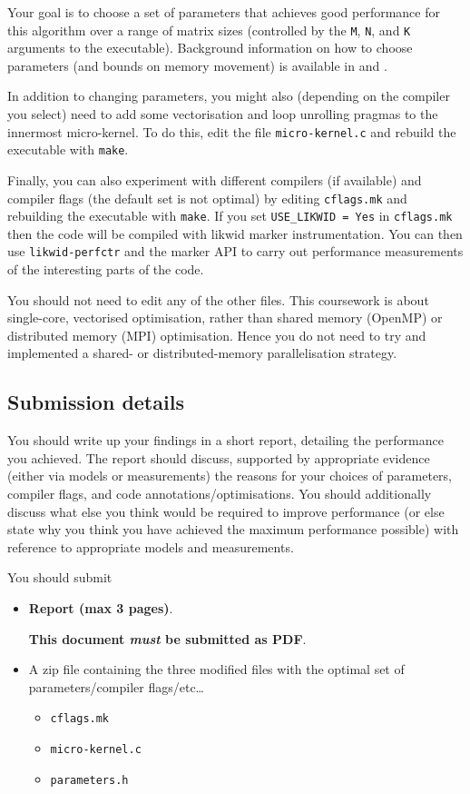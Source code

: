 \documentclass[a4paper]{article}
\begin{document}
Your goal is to choose a set of parameters that achieves good
performance for this algorithm over a range of matrix sizes
(controlled by the \texttt{M}, \texttt{N}, and \texttt{K} arguments to
the executable). Background information on how to choose
parameters (and bounds on memory movement) is available in
\textcite{Low:2016} and \textcite{Smith:2017}.

In addition to changing parameters, you might also (depending on the
compiler you select) need to add some vectorisation and loop unrolling
pragmas to the innermost micro-kernel. To do this, edit the file
\texttt{micro-kernel.c} and rebuild the executable with \texttt{make}.

Finally, you can also experiment with different compilers (if
available) and compiler flags (the default set is not optimal) by
editing \texttt{cflags.mk} and rebuilding the executable with
\texttt{make}. If you set \texttt{USE\_LIKWID = Yes} in
\texttt{cflags.mk} then the code will be compiled with likwid marker
instrumentation. You can then use \texttt{likwid-perfctr} and the
marker API to carry out performance measurements of the interesting
parts of the code.

You should not need to edit any of the other files. This coursework is
about single-core, vectorised optimisation, rather than shared memory
(OpenMP) or distributed memory (MPI) optimisation. Hence you do not
need to try and implemented a shared- or distributed-memory
parallelisation strategy.

\pagebreak
\subsection{Submission details}
\label{sec:submission}

You should write up your findings in a short report, detailing the
performance you achieved. The report should discuss, supported by
appropriate evidence (either via models or measurements) the reasons
for your choices of parameters, compiler flags, and code
annotations/optimisations. You should additionally discuss what else
you think would be required to improve performance (or else state why
you think you have achieved the maximum performance possible) with
reference to appropriate models and measurements.

You should submit

\begin{itemize}
\item \textbf{Report (max 3 pages)}.

  \textbf{This document \emph{must} be submitted as PDF}.

  
\item A zip file containing the three modified files with the optimal set of
  parameters/compiler flags/etc\dots
  \begin{itemize}
  \item \texttt{cflags.mk}
  \item \texttt{micro-kernel.c}
  \item \texttt{parameters.h}
  \end{itemize}
\end{itemize}
\end{document}
